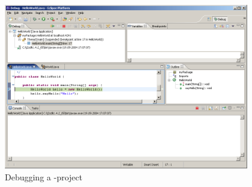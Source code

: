 \begin{itemize}
\begin{figure}[htbp]
	\centering
		\includegraphics[width=0.95\textwidth]{images/debug1.png}
	\caption{Debugging a \caesarj -project}
	\label{fig:debug1}
\end{figure}
\end{itemize}